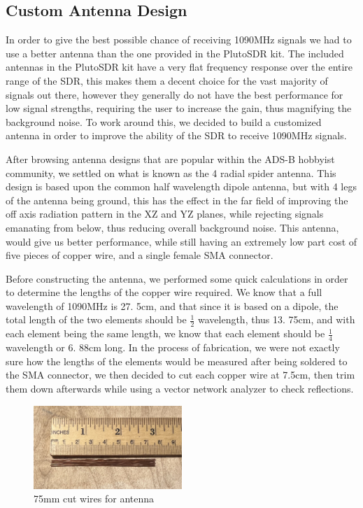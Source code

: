 \documentclass[conference, onecolumn]{IEEEtran}
\begin{document}
\subsection{Custom Antenna Design}
In order to give the best possible chance of receiving 1090MHz signals we had to use a better antenna than the one provided in the PlutoSDR kit. The included antennas in the PlutoSDR kit have a very flat frequency response over the entire range of the SDR, this makes them a decent choice for the vast majority of signals out there, however they generally do not have the best performance for low signal strengths, requiring the user to increase the gain, thus magnifying the background noise. To work around this, we decided to build a customized antenna in order to improve the ability of the SDR to receive 1090MHz signals.

After browsing antenna designs that are popular within the ADS-B hobbyist community, we settled on what is known as the 4 radial spider antenna.
This design is based upon the common half wavelength dipole antenna, but with 4 legs of the antenna being ground, this has the effect in the far field of improving the off axis radiation pattern in the XZ and YZ planes, while rejecting signals emanating from below, thus reducing overall background noise.
This antenna, would give us better performance, while still having an extremely low part cost of five pieces of copper wire, and a single female SMA connector.

Before constructing the antenna, we performed some quick calculations in order to determine the lengths of the copper wire required.
We know that a full wavelength of 1090MHz is 27.
5cm, and that since it is based on a dipole, the total length of the two elements should be $\frac{1}{2}$ wavelength, thus 13.
75cm, and with each element being the same length, we know that each element should be $\frac{1}{4}$ wavelength or 6.
88cm long. In the process of fabrication, we were not exactly sure how the lengths of the elements would be measured after being soldered to the SMA connector, we then decided to cut each copper wire at 7.5cm, then trim them down afterwards while using a vector network analyzer to check reflections.

\begin{figure}
  \begin{center}
    \includegraphics[width=0.5\textwidth]{./figures/fig_antenna elements straight.jpg}
  \end{center}
  \caption{75mm cut wires for antenna}\label{fig:ant_el_st}
\end{figure}
\end{document}
